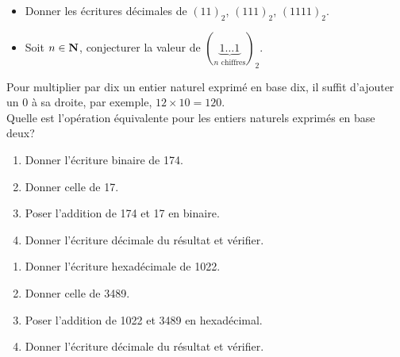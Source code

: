 \begin{exercice}
    \begin{itemize}
        \item 	Donner les écritures décimales de $(11)_2$, $(111)_2$, $(1111)_2$.
        \item   Soit $n \in \mathbf{N}$, conjecturer la valeur de $ \left(\underbrace{1\ldots 1}_{n\textrm{ chiffres}}\right)_2$.
    \end{itemize}
\end{exercice}

\begin{exercice}
    Pour multiplier par dix un entier naturel exprimé en base dix, il suffit d'ajouter un 0 à sa
    droite, par exemple, $12\times 10 = 120$.\\
    Quelle est l'opération équivalente pour les entiers naturels exprimés en base deux?
\end{exercice}

\begin{exercice}
    \begin{enumerate}
        \item 	Donner l'écriture binaire de 174.
        \item 	Donner celle de 17.
        \item 	Poser l'addition de 174 et 17 en binaire.
        \item 	Donner l'écriture décimale du résultat et vérifier.
    \end{enumerate}
\end{exercice}

\begin{exercice}
    \begin{enumerate}
        \item 	Donner l'écriture hexadécimale de 1022.
        \item 	Donner celle de 3489.
        \item 	Poser l'addition de 1022 et 3489 en hexadécimal.
        \item 	Donner l'écriture décimale du résultat et vérifier.
    \end{enumerate}
\end{exercice}

